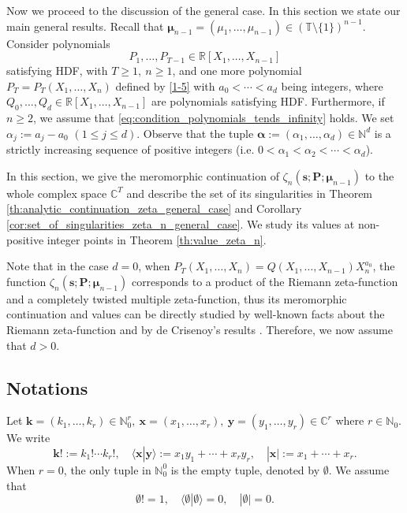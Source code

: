\documentclass[a4paper,12pt]{article}
\theoremstyle{definition}
\numberwithin{equation}{section}
\def\C{{\mathbb C}}
\begin{document}
Now we proceed to the discussion of the general case. In this section we state our main general results. Recall that $\boldsymbol{\mu}_{n-1}=(\mu_1,\ldots,\mu_{n-1}) \in (\mathbb{T}\setminus\{1\})^{n-1}$.   Consider polynomials 
$$ P_1,\ldots,P_{T-1} \in \mathbb{R}[X_1,\ldots,X_{n-1}] $$ 
satisfying HDF, with $T \geq 1, \ n \geq 1$, and one more polynomial $P_T=P_T(X_1,\ldots,X_n)$ defined by \eqref{1-5} with $a_0<\cdots<a_d$ being integers, where $Q_0,\ldots,Q_d \in \mathbb{R}[X_1,\ldots,X_{n-1}]$ are polynomials satisfying HDF. Furthermore, if $n \geq 2$, we assume that \eqref{eq:condition_polynomials_tends_infinity} holds. We set $\alpha_j:=a_j-a_0$ $(1 \leq j \leq d)$. Observe that the tuple $\boldsymbol{\alpha}:=(\alpha_1,\ldots,\alpha_d)\in \mathbb{N}^d$ is a strictly increasing sequence of positive integers (i.e. $0 < \alpha_1 < \alpha_2 < \cdots < \alpha_d$).

In this section, we give the meromorphic continuation of $\zeta_{n}(\mathbf{s};\mathbf{P};\boldsymbol{\mu}_{n-1})$ to the whole complex space $\C^T$ and describe the set of its singularities in Theorem \ref{th:analytic_continuation_zeta_general_case} and Corollary \ref{cor:set_of_singularities_zeta_n_general_case}. We study its values at non-positive integer points in Theorem \ref{th:value_zeta_n}.

Note that in the case $d=0$, when $P_T(X_1,\ldots,X_n)=Q(X_1,\ldots,X_{n-1})X_n^{a_0}$, the function $\zeta_{n}(\mathbf{s};\mathbf{P};\boldsymbol{\mu}_{n-1})$ corresponds to a product of the Riemann zeta-function and a completely twisted multiple zeta-function, thus its meromorphic continuation and values can be directly studied by well-known facts about the Riemann zeta-function and by de Crisenoy's results \cite{dC}. Therefore, we now assume that $d>0$.

\subsection{Notations}

Let $\mathbf{k}=(k_1,\ldots,k_r) \in \mathbb{N}_0^r, \ \mathbf{x}=(x_1,\ldots,x_r), \ \mathbf{y}=(y_1,\ldots,y_r) \in \mathbb{C}^r$ where $r \in \mathbb{N}_0$. We write
$$ \mathbf{k}!:=k_1! \cdots k_r!, \quad \langle \boldsymbol{x}|\mathbf{y} \rangle:= x_1 y_1+\cdots +x_r y_r, \quad |\mathbf{x}|:=x_1+\cdots+x_r. $$
When $r=0$, the only tuple in $\mathbb{N}^0_0$ is the empty tuple, denoted by $\emptyset$. We assume that
$$ \emptyset !=1, \quad \langle \emptyset | \emptyset \rangle=0, \quad |\emptyset|=0. $$
\end{document}
